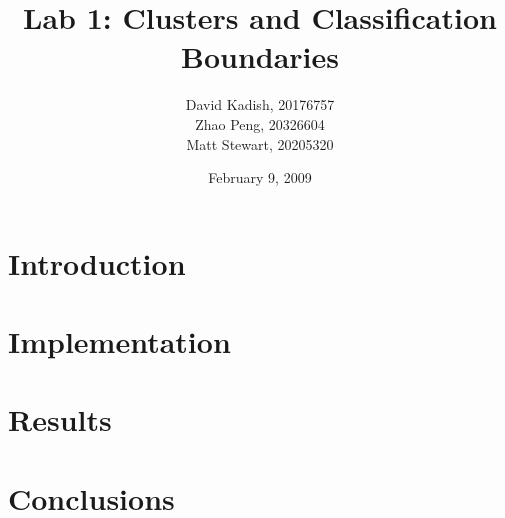 \documentclass[12pt]{sydeStyle}
\title{Lab 1: Clusters and Classification Boundaries}
\author{
    David Kadish, 20176757\\
    Zhao Peng, 20326604\\
    Matt Stewart, 20205320\\
}
\date{February 9, 2009}
\begin{document}

\maketitle

\setcounter{page}{2} %


\chapter{Introduction}


\chapter{Implementation}

\chapter{Results}

\chapter{Conclusions}

\appendix
\renewcommand{\thechapter}{\Alph{chapter}}
\end{document}
